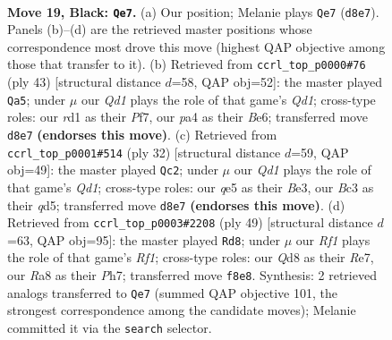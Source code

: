 \documentclass[11pt]{article}
\begin{document}
\clearpage

\begin{figure}[p]\centering
\begin{subfigure}{0.46\textwidth}\centering
\resizebox{\linewidth}{!}{%
\newchessgame
\chessboard[
  setfen={r2q1rk1/p4p1p/4p3/pP1pQ1P1/P2P2P1/2b4P/2P5/2KR3R b - - 0 19},
  showmover=false,
  pgfstyle=straightmove, color=movearrow, markmove={d8-e7}
]}
\caption{}
\end{subfigure}\hfill
\begin{subfigure}{0.46\textwidth}\centering
\resizebox{\linewidth}{!}{%
\newchessgame
\chessboard[
  setfen={r2q1rk1/pp3pp1/4b2p/3pP3/3Q3P/P5P1/1P3PB1/2R1R1K1 b - - 0 22},
  showmover=false,
  pgfstyle=straightmove, color=movearrow, markmove={d8-a5}
]}
\caption{}
\end{subfigure}
\\[4pt]
\begin{subfigure}{0.46\textwidth}\centering
\resizebox{\linewidth}{!}{%
\newchessgame
\chessboard[
  setfen={5rk1/prp1bpp1/4p2p/3q4/2pP4/4B1P1/PP2PP1P/1R1Q1RK1 w - - 0 17},
  showmover=false,
  pgfstyle=straightmove, color=movearrow, markmove={d1-c2}
]}
\caption{}
\end{subfigure}\hfill
\begin{subfigure}{0.46\textwidth}\centering
\resizebox{\linewidth}{!}{%
\newchessgame
\chessboard[
  setfen={5rk1/p3rppp/Qp3q2/2P5/3P1p2/5P2/P5PP/R2R2K1 b - - 1 25},
  showmover=false,
  pgfstyle=straightmove, color=movearrow, markmove={f8-d8}
]}
\caption{}
\end{subfigure}
\caption{\textbf{Move 19, Black: \texttt{Qe7}.} (a) Our position; Melanie plays \texttt{Qe7} (\texttt{d8e7}). Panels (b)--(d) are the retrieved master positions whose correspondence most drove this move (highest QAP objective among those that transfer to it). (b) Retrieved from \texttt{ccrl\_top\_p0000\#76} (ply 43) [structural distance $d$=58, QAP obj=52]: the master played \texttt{Qa5}; under $\mu$ our \emph{Qd1} plays the role of that game's \emph{Qd1}; cross-type roles: our \emph{r}d1 as their \emph{P}f7, our \emph{p}a4 as their \emph{B}e6; transferred move \texttt{d8e7} \textbf{(endorses this move)}. (c) Retrieved from \texttt{ccrl\_top\_p0001\#514} (ply 32) [structural distance $d$=59, QAP obj=49]: the master played \texttt{Qc2}; under $\mu$ our \emph{Qd1} plays the role of that game's \emph{Qd1}; cross-type roles: our \emph{q}e5 as their \emph{B}e3, our \emph{B}c3 as their \emph{q}d5; transferred move \texttt{d8e7} \textbf{(endorses this move)}. (d) Retrieved from \texttt{ccrl\_top\_p0003\#2208} (ply 49) [structural distance $d$=63, QAP obj=95]: the master played \texttt{Rd8}; under $\mu$ our \emph{Rf1} plays the role of that game's \emph{Rf1}; cross-type roles: our \emph{Q}d8 as their \emph{R}e7, our \emph{R}a8 as their \emph{P}h7; transferred move \texttt{f8e8}. Synthesis: 2 retrieved analogs transferred to \texttt{Qe7} (summed QAP objective 101, the strongest correspondence among the candidate moves); Melanie committed it via the \texttt{search} selector.}
\label{fig:thought-m37}
\end{figure}
\end{document}
